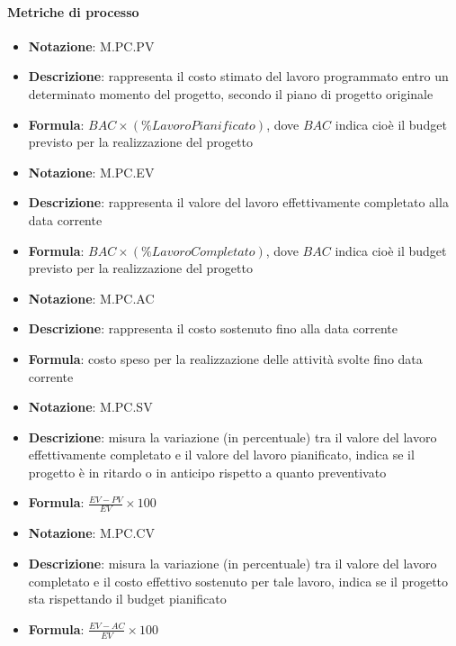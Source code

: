 \paragraph{Metriche di processo}
\textbf{}
\begin{itemize}
    \item \textbf{Notazione}: M.PC.PV
    \item \textbf{Descrizione}: rappresenta il costo stimato del lavoro programmato entro un determinato momento del progetto, secondo il piano di progetto originale
    \item \textbf{Formula}: $BAC \times (\% Lavoro Pianificato)$, dove $BAC$ indica  cioè il budget previsto per la realizzazione del progetto
\end{itemize}
\textbf{}
\begin{itemize}
    \item \textbf{Notazione}: M.PC.EV
    \item \textbf{Descrizione}: rappresenta il valore del lavoro effettivamente completato alla data corrente
    \item \textbf{Formula}: $BAC \times (\% Lavoro Completato)$, dove $BAC$ indica  cioè il budget previsto per la realizzazione del progetto
\end{itemize}
\textbf{}
\begin{itemize}
    \item \textbf{Notazione}: M.PC.AC
    \item \textbf{Descrizione}: rappresenta il costo sostenuto fino alla data corrente
    \item \textbf{Formula}: costo speso per la realizzazione delle attività svolte fino data corrente
\end{itemize}
\textbf{}
\begin{itemize}
    \item \textbf{Notazione}: M.PC.SV
    \item \textbf{Descrizione}: misura la variazione (in percentuale) tra il valore del lavoro effettivamente completato e il valore del lavoro pianificato, indica se il progetto è in ritardo o in anticipo rispetto a quanto preventivato
    \item \textbf{Formula}: $\frac{EV - PV}{EV} \times 100$
\end{itemize}
\textbf{}
\begin{itemize}
    \item \textbf{Notazione}: M.PC.CV
    \item \textbf{Descrizione}: misura la variazione (in percentuale) tra il valore del lavoro completato e il costo effettivo sostenuto per tale lavoro, indica se il progetto sta rispettando il budget pianificato
    \item \textbf{Formula}: $\frac{EV - AC}{EV} \times 100$
\end{itemize}
